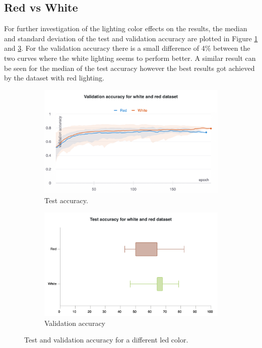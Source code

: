 \subsection{Red vs White}
\label{sec:results:spaghetti:colour}
	 For further investigation of the lighting color effects on the results, the median and standard deviation of the test and validation accuracy are plotted in Figure \ref{ref:res:sd:ta:rw} and \ref{fig:res:sd:va:rw}. For the validation accuracy there is a small difference of 4\% between the two curves where the white lighting seems to perform better. A similar result can be seen for the median of the test accuracy however the best results got achieved by the dataset with red lighting. 

	\begin{figure}[hbtp]
		\begin{subfigure}{0.49\textwidth}
		\centering
		\includegraphics[width=\linewidth]{fig/results/wandb/spaghetti_dataset/charts/Section-16-Panel-0-gkiaebqxq}
		\caption{Test accuracy.}
		\label{ref:res:sd:ta:rw}
		\end{subfigure}
		\hspace*{\fill}
		\begin{subfigure}{0.49\textwidth}
		\centering
		\includegraphics[width=\linewidth]{fig/results/wandb/spaghetti_dataset/charts/Section-16-Panel-1-lgbosq568}
		\caption{Validation accuracy}
		\label{fig:res:sd:va:rw}
		\end{subfigure}
		\caption{Test and validation accuracy for a different led color.}
	\end{figure}
	

